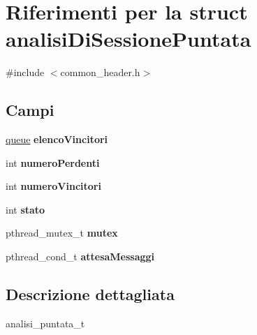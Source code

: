 \hypertarget{structanalisiDiSessionePuntata}{
\section{Riferimenti per la struct analisiDiSessionePuntata}
\label{structanalisiDiSessionePuntata}
}


{\ttfamily \#include $<$common\_\-header.h$>$}

\subsection*{Campi}
\begin{DoxyCompactItemize}
\item 
\hypertarget{structanalisiDiSessionePuntata_a4c23557187a3d6b8c854f186820b7392}{
\hyperlink{structqueue}{queue} {\bfseries elencoVincitori}}
\label{structanalisiDiSessionePuntata_a4c23557187a3d6b8c854f186820b7392}

\item 
\hypertarget{structanalisiDiSessionePuntata_a4a6cb03059088a14e3a4a78f22373d1d}{
int {\bfseries numeroPerdenti}}
\label{structanalisiDiSessionePuntata_a4a6cb03059088a14e3a4a78f22373d1d}

\item 
\hypertarget{structanalisiDiSessionePuntata_a1fe7bd47ed6d8d3ed45d054d30e12a87}{
int {\bfseries numeroVincitori}}
\label{structanalisiDiSessionePuntata_a1fe7bd47ed6d8d3ed45d054d30e12a87}

\item 
\hypertarget{structanalisiDiSessionePuntata_a100c945c813d21020ba719a70e6be936}{
int {\bfseries stato}}
\label{structanalisiDiSessionePuntata_a100c945c813d21020ba719a70e6be936}

\item 
\hypertarget{structanalisiDiSessionePuntata_aac8b1425ee3c6d685dcde4c8465845c1}{
pthread\_\-mutex\_\-t {\bfseries mutex}}
\label{structanalisiDiSessionePuntata_aac8b1425ee3c6d685dcde4c8465845c1}

\item 
\hypertarget{structanalisiDiSessionePuntata_a8a75b218e6660ccebd4cea7fcb0da6e3}{
pthread\_\-cond\_\-t {\bfseries attesaMessaggi}}
\label{structanalisiDiSessionePuntata_a8a75b218e6660ccebd4cea7fcb0da6e3}

\end{DoxyCompactItemize}


\subsection{Descrizione dettagliata}
analisi\_\-puntata\_\-t

